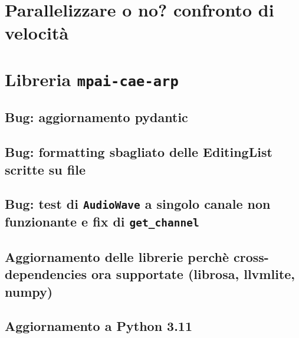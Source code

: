 \section{Parallelizzare o no? confronto di velocità} \label{sec:parallelizzazione}
\section{Libreria \texttt{mpai-cae-arp}}    %
\subsection{Bug: aggiornamento pydantic}    %
\subsection{Bug: formatting sbagliato delle EditingList scritte su file}
\subsection{Bug: test di \texttt{AudioWave} a singolo canale non funzionante e fix di \texttt{get\_channel}}
\subsection{Aggiornamento delle librerie perchè cross-dependencies ora supportate (librosa, llvmlite, numpy)}
\subsection{Aggiornamento a Python 3.11} \label{ssec:py-311}
